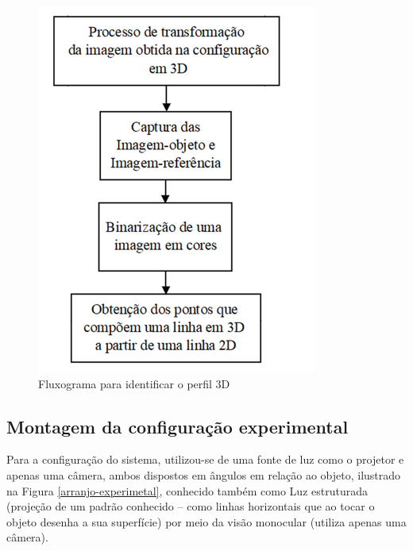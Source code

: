 \documentclass[a4paper, 12pt]{article}
\begin{document}
\begin{figure}[h!]
	\centering
		\includegraphics[width=.55\linewidth]{fluxograma_identificar_3D.png}
	\caption{Fluxograma para identificar o perfil 3D}
	\label{fluxograma_identificar_3D}
\end{figure}

\subsection{Montagem da configuração experimental}

Para a configuração do sistema, utilizou-se de uma fonte de luz como o projetor e apenas uma câmera, ambos dispostos em ângulos em relação ao objeto, ilustrado na Figura \ref{arranjo-experimetal}, conhecido também como Luz estruturada (projeção de um padrão conhecido – como linhas horizontais que ao tocar o objeto desenha a sua superfície) por meio da visão monocular (utiliza apenas uma câmera).
\end{document}
